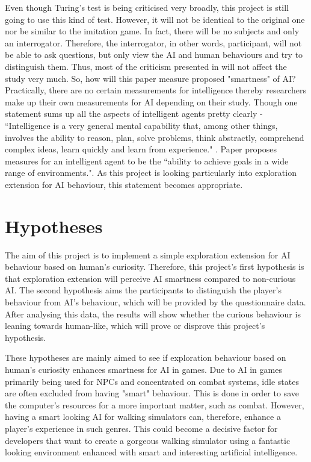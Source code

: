 \documentclass[journal]{IEEEtran}
\begin{document}
Even though Turing's test is being criticised very broadly, this project is still going to use this kind of test. However, it will not be identical to the original one nor be similar to the imitation game. In fact, there will be no subjects and only an interrogator. Therefore, the interrogator, in other words, participant, will not be able to ask questions, but only view the AI and human behaviours and try to distinguish them. Thus, most of the criticism presented in \cite{hayes1995turing}\cite{sweeney2003s}\cite{crockett1994turing}\cite{livingstone2006turing} will not affect the study very much. So, how will this paper measure proposed "smartness" of AI? Practically, there are no certain measurements for intelligence thereby researchers make up their own measurements for AI depending on their study. Though one statement sums up all the aspects of intelligent agents pretty clearly - ``Intelligence is a very general mental capability that, among other things, involves the ability to reason, plan, solve problems, think abstractly, comprehend complex ideas, learn quickly and learn from experience." \cite{gottfredson1997mainstream}. Paper \cite{legg2007universal} proposes measures for an intelligent agent to be the ``ability to achieve goals in a wide range of environments.". As this project is looking particularly into exploration extension for AI behaviour, this statement becomes appropriate. %

\section{Hypotheses}
The aim of this project is to implement a simple exploration extension for AI behaviour based on human's curiosity. Therefore, this project's first hypothesis is that exploration extension will perceive AI smartness compared to non-curious AI. The second hypothesis aims the participants to distinguish the player's behaviour from AI's behaviour, which will be provided by the questionnaire data. After analysing this data, the results will show whether the curious behaviour is leaning towards human-like, which will prove or disprove this project's hypothesis.%

These hypotheses are mainly aimed to see if exploration behaviour based on human's curiosity enhances smartness for AI in games. Due to AI in games primarily being used for NPCs and concentrated on combat systems, idle states are often excluded from having "smart" behaviour. This is done in order to save the computer's resources for a more important matter, such as combat. However, having a smart looking AI for walking simulators can, therefore, enhance a player's experience in such genres. This could become a decisive factor for developers that want to create a gorgeous walking simulator using a fantastic looking environment enhanced with smart and interesting artificial intelligence. %
\end{document}
